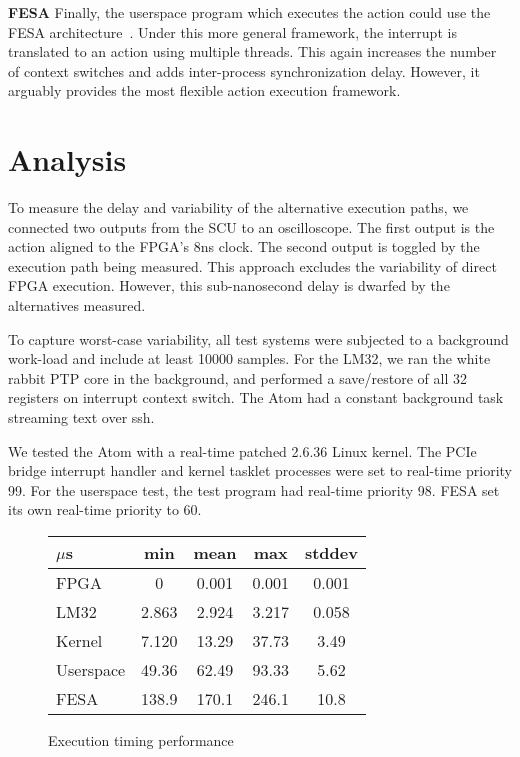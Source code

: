 \documentclass{JAC2003}
\begin{document}
\textbf{FESA}
Finally, the userspace program which executes the action could use the FESA
architecture~\cite{fesa}.
Under this more general framework,
the interrupt is translated to an action using multiple threads.
This again increases the number of context switches and adds inter-process
synchronization delay.
However, it arguably provides the most flexible action execution framework.

\section{Analysis}
To measure the delay and variability of the alternative execution paths,
we connected two outputs from the SCU to an oscilloscope.
The first output is the action aligned to the FPGA's 8ns clock.
The second output is toggled by the execution path being measured.
This approach excludes the variability of direct FPGA execution.
However, this sub-nanosecond delay is dwarfed by the alternatives measured.

To capture worst-case variability, 
all test systems were subjected to a background work-load
and include at least 10000 samples.
For the LM32, 
we ran the white rabbit PTP core in the background,
and performed a save/restore of all 32 registers on interrupt context switch.
The Atom had a constant background task streaming text over ssh.

We tested the Atom with a real-time patched 2.6.36 Linux kernel.
The PCIe bridge interrupt handler and kernel tasklet processes were set to
real-time priority 99.
For the userspace test, the test program had real-time priority 98.
FESA set its own real-time priority to 60.

\begin{figure}[t]
   \centering
   \begin{tabular}{l|c|c|c|c}
     $\mu$s    & min   & mean  & max   & stddev \\
     \hline
     FPGA      & 0 & 0.001 & 0.001 & 0.001 \\
     LM32      & 2.863 & 2.924 & 3.217 & 0.058  \\
     Kernel    & 7.120 & 13.29 & 37.73 & 3.49   \\
     Userspace & 49.36 & 62.49 & 93.33 & 5.62   \\
     FESA      & 138.9 & 170.1 & 246.1 & 10.8 \\
   \end{tabular}
   \caption{Execution timing performance}
\end{figure}
\end{document}
